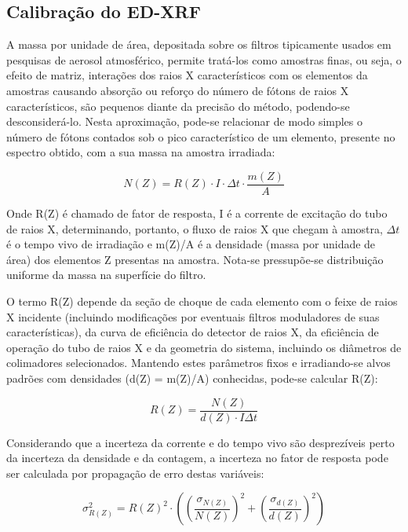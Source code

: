 \subsection{Calibração do ED-XRF}

A massa por unidade de área, depositada sobre os filtros tipicamente usados em 
pesquisas de aerosol atmosférico, permite tratá-los como amostras finas,
ou seja, o efeito de matriz, interações dos raios X característicos com os 
elementos da amostras causando absorção ou reforço do número de fótons de 
raios X característicos, são pequenos diante da precisão do método,
podendo-se desconsiderá-lo. Nesta aproximação, pode-se relacionar de modo 
simples o número de fótons contados sob o pico característico de um elemento, 
presente no espectro obtido, com a sua massa na amostra irradiada:

\begin{equation}
  \label{eq:contagem}
  N(Z) = R(Z) \cdot I \cdot \Delta t  \cdot \frac{m(Z)}{A}
\end{equation}

Onde R(Z) é chamado de fator de resposta, I é a corrente de excitação do tubo 
de raios X, determinando, portanto, o fluxo de raios X que chegam à amostra, 
$\Delta t$ é o tempo vivo de irradiação e m(Z)/A é a densidade 
(massa por unidade de área) dos elementos Z presentas na amostra. 
Nota-se pressupõe-se distribuição uniforme da massa na superfície do filtro.

O termo R(Z) depende da seção de choque de cada elemento com o feixe de 
raios X incidente (incluindo modificações por eventuais filtros moduladores 
de suas características), da curva de eficiência do detector de raios X, 
da eficiência de operação do tubo de raios X e da geometria do sistema, 
incluindo os diâmetros de colimadores selecionados. Mantendo estes parâmetros 
fixos e irradiando-se alvos padrões com densidades (d(Z) = m(Z)/A) 
conhecidas, pode-se calcular R(Z):

\begin{equation}
  \label{eq:fator_de_resposta}
  R(Z) = \frac{N(Z)}{d(Z) \cdot I \Delta t}
\end{equation}

Considerando que a incerteza da corrente e do tempo vivo são desprezíveis 
perto da incerteza da densidade e da contagem, a incerteza no fator de resposta
pode ser calculada por propagação de erro destas variáveis:

\begin{equation}
  \label{eq:erro_fator_de_resposta}
  \sigma_{R(Z)}^2 = {R(Z)}^2 \cdot \left( \left(\frac{\sigma_{N(Z)}}{N(Z)}\right)^2 + 
                                      \left(\frac{\sigma_{d(Z)}}{d(Z)}\right)^2 
                                   \right)
\end{equation}

